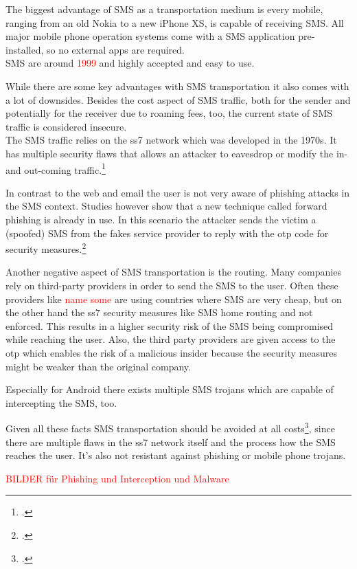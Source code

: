 The biggest advantage of SMS as a transportation medium is every mobile, ranging from an old Nokia to a new iPhone XS, is capable of receiving SMS. All major mobile phone operation systems come with a SMS application pre-installed, so no external apps are required.\\
SMS are around \textcolor{red}{1999} and highly accepted and easy to use.

While there are some key advantages with SMS transportation it also comes with a lot of downsides. Besides the cost aspect of SMS traffic, both for the sender and potentially for the receiver due to roaming fees, too, the current state of SMS traffic is considered insecure.\\
The SMS traffic relies on the \gls{ss7} network which was developed in the 1970s. It has multiple security flaws that allows an attacker to eavesdrop or modify the in- and out-coming traffic.\footcite{WELCH201717,7997246,puzankov2017stealthy}

In contrast to the web and email the user is not very aware of phishing attacks in the SMS context. Studies however show that a new technique called forward phishing is already in use. In this scenario the attacker sends the victim a (spoofed) SMS from the fakes service provider to reply with the \gls{otp} code for security measures.\footcite{JAKOBSSON20186,SIADATI201714}

Another negative aspect of SMS transportation is the routing. Many companies rely on third-party providers in order to send the SMS to the user. Often these providers like \textcolor{red}{name some} are using countries where SMS are very cheap, but on the other hand the \gls{ss7} security measures like SMS home routing and not enforced. This results in a higher security risk of the SMS being compromised while reaching the user. Also, the third party providers are given access to the \gls{otp} which enables the risk of a malicious insider because the security measures might be weaker than the original company.

Especially for Android there exists multiple SMS trojans which are capable of intercepting the SMS, too.

Given all these facts SMS transportation should be avoided at all costs\footcite{JAKOBSSON20186}, since there are multiple flaws in the \gls{ss7} network itself and the process how the SMS reaches the user. It's also not resistant against phishing or mobile phone trojans.


\textcolor{red}{BILDER für Phishing und Interception und Malware}

